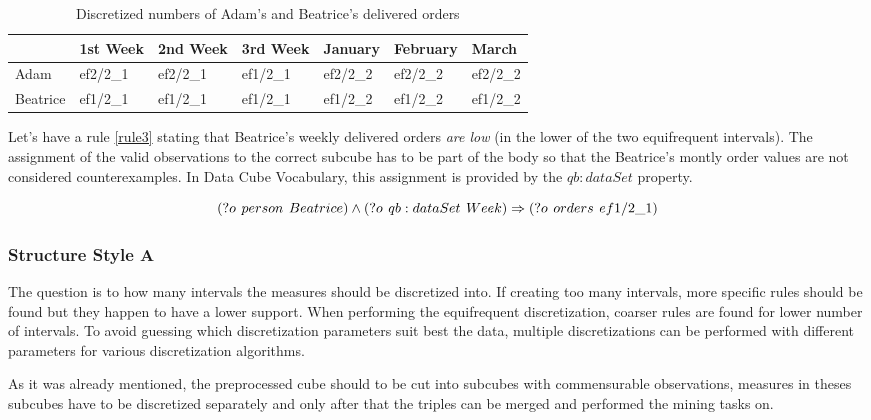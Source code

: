 \begin{table}[h]
\centering
\begin{tabular}{l|llllll}
             & 1st Week & 2nd Week & 3rd Week & January  & February & March     \\ 
\hline
Adam     & ef2/2\_1 & ef2/2\_1 & ef1/2\_1 & ef2/2\_2 & ef2/2\_2 & ef2/2\_2  \\
Beatrice & ef1/2\_1 & ef1/2\_1 & ef1/2\_1 & ef1/2\_2 & ef1/2\_2 & ef1/2\_2 
\end{tabular}
\caption{Discretized numbers of Adam's and Beatrice's delivered orders}\label{table4}
\end{table}

Let's have a rule \ref{rule3} stating that Beatrice's weekly delivered orders \textit{are low} (in the lower of the two equifrequent intervals). The assignment of the valid observations to the correct subcube has to be part of the body so that the Beatrice's montly order values are not considered counterexamples. In Data Cube Vocabulary, this assignment is provided by the $qb:dataSet$ property.

\begin{equation}\label{rule3}
(?o\hspace{0.4em}person\hspace{0.4em}Beatrice) \land (?o\hspace{0.4em}qb:dataSet\hspace{0.4em}Week)  \Rightarrow (?o\hspace{0.4em}orders\hspace{0.4em}ef1/2\_1)
\end{equation}

\subsubsection{Structure Style A}

The question is to how many intervals the measures should be discretized into. If creating too many intervals, more specific rules should be found but they happen to have a lower support. When performing the equifrequent discretization, coarser rules are found for lower number of intervals. To avoid guessing which discretization parameters suit best the data, multiple discretizations can be performed with different parameters for various discretization algorithms.

As it was already mentioned, the preprocessed cube should to be cut into subcubes with commensurable observations, measures in theses subcubes have to be discretized separately and only after that the triples can be merged and performed the mining tasks on.


